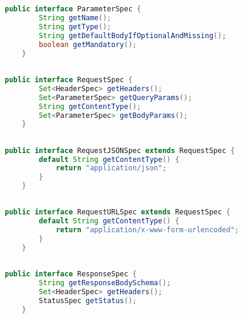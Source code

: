 \subsection{}

\begin{lstlisting}[language=Java]
    public interface ParameterSpec {
        String getName();
        String getType();
        String getDefaultBodyIfOptionalAndMissing();
        boolean getMandatory();
    }
\end{lstlisting}

\subsection{}

\begin{lstlisting}[language=Java]
    public interface RequestSpec {
        Set<HeaderSpec> getHeaders();
        Set<ParameterSpec> getQueryParams();
        String getContentType();
        Set<ParameterSpec> getBodyParams();
    }
\end{lstlisting}

\subsection{}

\begin{lstlisting}[language=Java]
    public interface RequestJSONSpec extends RequestSpec {
        default String getContentType() {
            return "application/json";
        }
    }    
\end{lstlisting}

\subsection{}

\begin{lstlisting}[language=Java]
    public interface RequestURLSpec extends RequestSpec {
        default String getContentType() {
            return "application/x-www-form-urlencoded";
        }
    }
\end{lstlisting}

\subsection{}

\begin{lstlisting}[language=Java]
    public interface ResponseSpec {
        String getResponseBodySchema();
        Set<HeaderSpec> getHeaders();
        StatusSpec getStatus();
    }
\end{lstlisting}

